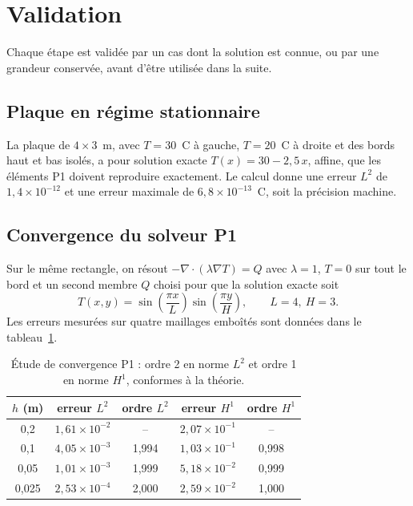 \section{Validation}\label{sec:validation}
Chaque étape est validée par un cas dont la solution est connue, ou par une grandeur conservée, avant d'être
utilisée dans la suite.

\subsection{Plaque en régime stationnaire}
La plaque de $4\times3$~m, avec $T=30$~\textdegree C à gauche, $T=20$~\textdegree C à droite et des bords haut
et bas isolés, a pour solution exacte $T(x)=30-2{,}5\,x$, affine, que les éléments P1 doivent reproduire
exactement. Le calcul donne une erreur $L^2$ de $1{,}4\times10^{-12}$ et une erreur maximale de
$6{,}8\times10^{-13}$~\textdegree C, soit la précision machine.

\subsection{Convergence du solveur P1}
Sur le même rectangle, on résout $-\nabla\!\cdot(\lambda\nabla T)=Q$ avec $\lambda=1$, $T=0$ sur tout le bord
et un second membre $Q$ choisi pour que la solution exacte soit
\begin{equation}
T(x,y)=\sin\!\left(\frac{\pi x}{L}\right)\sin\!\left(\frac{\pi y}{H}\right),\qquad L=4,\ H=3 .
\end{equation}
Les erreurs mesurées sur quatre maillages emboîtés sont données dans le tableau~\ref{tab:convergence}.

\begin{table}[h]
\centering
\begin{tabular}{ccccc}
\toprule
$h$ (m) & erreur $L^2$ & ordre $L^2$ & erreur $H^1$ & ordre $H^1$ \\
\midrule
0,2   & $1{,}61\times10^{-2}$ & -- & $2{,}07\times10^{-1}$ & -- \\
0,1   & $4{,}05\times10^{-3}$ & 1,994 & $1{,}03\times10^{-1}$ & 0,998 \\
0,05  & $1{,}01\times10^{-3}$ & 1,999 & $5{,}18\times10^{-2}$ & 0,999 \\
0,025 & $2{,}53\times10^{-4}$ & 2,000 & $2{,}59\times10^{-2}$ & 1,000 \\
\bottomrule
\end{tabular}
\caption{Étude de convergence P1 : ordre 2 en norme $L^2$ et ordre 1 en norme $H^1$, conformes à la théorie.}
\label{tab:convergence}
\end{table}

